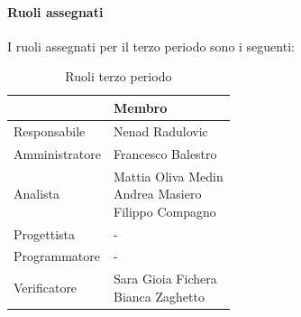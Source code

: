\documentclass[a4paper,12pt]{article}
\begin{document}
            \paragraph{Ruoli assegnati}
            I ruoli assegnati per il terzo periodo sono i seguenti:
                \begin{table}[H]
                \centering
                \begin{tabular}{|l|l|}
                \hline
                    \rowcolor{lightgray}{\textbf{Ruolo}} & {\textbf{Membro}} \\
                \hline
                    Responsabile & Nenad Radulovic \\
                \hline
                    Amministratore & Francesco Balestro \\
                \hline
                    Analista & \makecell[l]{Mattia Oliva Medin \\ Andrea Masiero \\ Filippo Compagno} \\
                \hline
                    Progettista & - \\
                \hline
                    Programmatore & - \\
                \hline
                    Verificatore & \makecell[l]{Sara Gioia Fichera \\ Bianca Zaghetto} \\
                \hline
                \end{tabular}
                \caption{Ruoli terzo periodo}
                \end{table}
                
\end{document}
